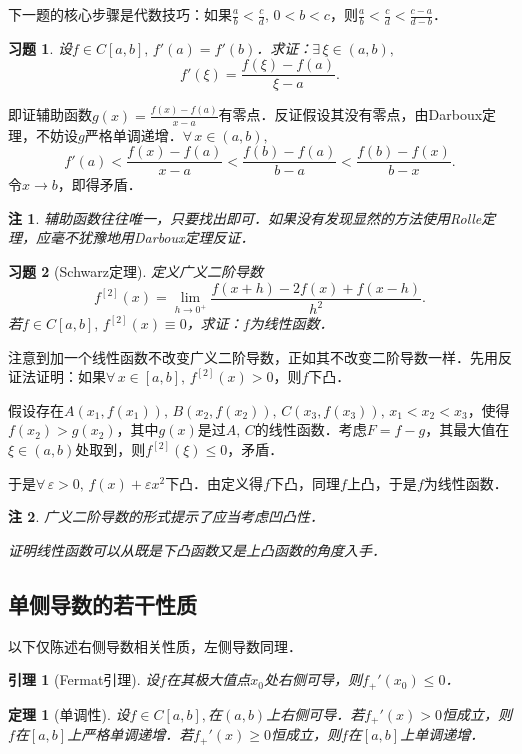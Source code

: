 \documentclass[11pt,a4paper]{ctexart}
\makeatletter
\theoremstyle{thmseries} %
\newtheorem{thm}{定理}[section]
\newtheorem{lem}{引理}[section]
\theoremstyle{exerseries}
\newtheorem{exer}{习题}[section]
\newtheorem*{rem}{注}
\renewenvironment{proof}[1][\proofname]{\par
  \pushQED{\qed}%
  \normalfont \topsep6\p@\@plus6\p@\relax
  \trivlist
  \item[\hskip\labelsep
        \itshape
    #1\@addpunct{}]\ignorespaces
}{%
  \popQED\endtrivlist\@endpefalse
}
\newenvironment{pf}{\begin{proof}[\bfseries\upshape 证\quad]}{\end{proof}}
\renewcommand{\epsilon}{\varepsilon}
\makeatother
\begin{document}
下一题的核心步骤是代数技巧：如果$\frac{a}{b}<\frac{c}{d},\,0<b<c$，则$\frac{a}{b}<\frac{c}{d}<\frac{c-a}{d-b}$．
\begin{exer}
	设$f\in C[a,b],\,f'(a)=f'(b)$．求证：$\exists\,\xi\in(a,b),$
	\[f'(\xi)=\frac{f(\xi)-f(a)}{\xi-a}.\]
\end{exer}
\begin{pf}
	即证辅助函数$g(x)=\frac{f(x)-f(a)}{x-a}$有零点．反证假设其没有零点，由Darboux定理，不妨设$g$严格单调递增．$\forall\,x\in(a,b),$
	\[f'(a)<\frac{f(x)-f(a)}{x-a}<\frac{f(b)-f(a)}{b-a}<\frac{f(b)-f(x)}{b-x}.\]
	令$x\to b$，即得矛盾．
\end{pf}
\begin{rem}
	辅助函数往往唯一，只要找出即可．如果没有发现显然的方法使用Rolle定理，应毫不犹豫地用Darboux定理反证．
\end{rem}

\begin{exer}[Schwarz定理]
	定义广义二阶导数
	\[f^{[2]}(x)=\lim_{h\to0^+}\frac{f(x+h)-2f(x)+f(x-h)}{h^2}.\]
	若$f\in C[a,b],\,f^{[2]}(x)\equiv0$，求证：$f$为线性函数．
\end{exer}
\begin{pf}
	注意到加一个线性函数不改变广义二阶导数，正如其不改变二阶导数一样．先用反证法证明：如果$\forall\,x\in[a,b],\,f^{[2]}(x)>0$，则$f$下凸．

	假设存在$A(x_1,f(x_1)),\,B(x_2,f(x_2)),\,C(x_3,f(x_3)),\,x_1<x_2<x_3$，使得$f(x_2)>g(x_2)$，其中$g(x)$是过$A,\,C$的线性函数．考虑$F=f-g$，其最大值在$\xi\in(a,b)$处取到，则$f^{[2]}(\xi)\leq0$，矛盾．

	于是$\forall\,\epsilon>0,\,f(x)+\epsilon x^2$下凸．由定义得$f$下凸，同理$f$上凸，于是$f$为线性函数．
\end{pf}
\begin{rem}
	广义二阶导数的形式提示了应当考虑凹凸性．

	证明线性函数可以从既是下凸函数又是上凸函数的角度入手．
\end{rem}


\subsection{单侧导数的若干性质}
以下仅陈述右侧导数相关性质，左侧导数同理．
\begin{lem}[Fermat引理]
	设$f$在其极大值点$x_0$处右侧可导，则$f_+'(x_0)\leq0$．
\end{lem}

\begin{thm}[单调性]
	设$f\in C[a,b],$在$(a,b)$上右侧可导．若$f_+'(x)>0$恒成立，则$f$在$[a,b]$上严格单调递增．若$f_+'(x)\geq0$恒成立，则$f$在$[a,b]$上单调递增．
\end{thm}
\end{document}

